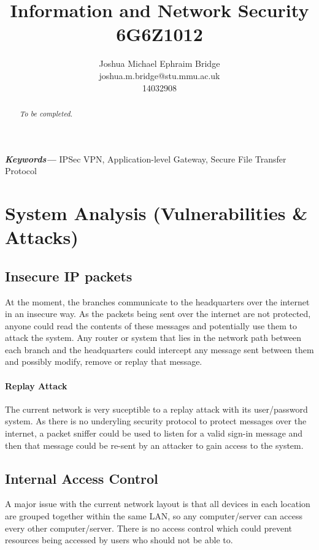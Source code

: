 \documentclass[11pt]{article}
\title{\vspace{2cm}\textbf{Information and Network Security}\\6G6Z1012}
\author{Joshua Michael Ephraim Bridge\\joshua.m.bridge@stu.mmu.ac.uk\\14032908}
\providecommand{\keywords}[1] {
  \small
  \textbf{\textit{Keywords---}} #1
}
\begin{document}
  \maketitle

  \vspace{1cm}

  \begin{abstract}
    \textit{To be completed.}
  \end{abstract}

  \vspace{0.5cm}

  \keywords{IPSec VPN, Application-level Gateway, Secure File Transfer Protocol}

  \newpage


  \section{System Analysis (Vulnerabilities \& Attacks)}
    \subsection{Insecure IP packets}
      At the moment, the branches communicate to the headquarters over the internet in an insecure way. As the packets being sent over the internet are not protected, anyone could read the contents of these messages and potentially use them to attack the system. Any router or system that lies in the network path between each branch and the headquarters could intercept any message sent between them and possibly modify, remove or replay that message.

      \paragraph{Replay Attack}
        The current network is very suceptible to a replay attack with its user/password system. As there is no underyling security protocol to protect messages over the internet, a packet sniffer could be used to listen for a valid sign-in message and then that message could be re-sent by an attacker to gain access to the system.

    \subsection{Internal Access Control}
      A major issue with the current network layout is that all devices in each location are grouped together within the same LAN, so any computer/server can access every other computer/server. There is no access control which could prevent resources being accessed by users who should not be able to.
\end{document}
